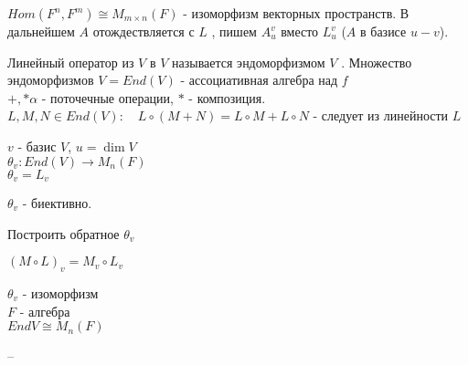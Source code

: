 \documentclass[12pt]{report}
\begin{document}
$Hom (F^n , F^m ) \cong M_{m\times n} (F)$ - изоморфизм векторных пространств.
В дальнейшем $A$ отождествляется с $L$ , пишем $A_u ^v $ вместо $L_u ^v$ ($A$ в базисе $u-v$). 
\begin{defn}
Линейный оператор  из $V $ в  $V$ называется эндоморфизмом $V$ .
Множество эндоморфизмов $V = End(V)$ - ассоциативная алгебра над $f$\\
$+, *\alpha$ - поточечные операции, $*$ - композиция.\\
$L, M, N \in End(V): \quad L\circ (M + N) = L \circ M + L \circ N$ - следует из линейности  $L$
\end{defn}
$v$  - базис $V$, $u = \dim V$ \\
$\theta _v : End(V) \to M_n (F)$ \\
$\theta _v = L_v$
\begin{st}
    $\theta_v$ -  биективно.
\end{st}
\begin{probl}
    Построить обратное $\theta_v$
\end{probl}

\begin{lm}
    $(M \circ L)_v = M_v \circ L_v$
\end{lm}
 \begin{st}
     $\theta _v$ - изоморфизм \\ $F$ - алгебра \\ $End V \cong M_n(F)$
\end{st}

--
\end{document}
